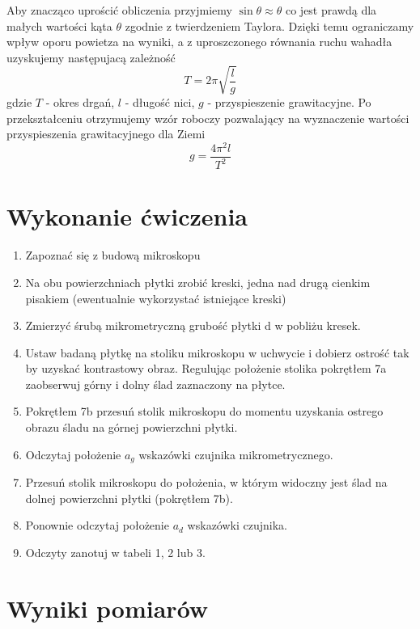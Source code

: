 \documentclass[a4paper,10pt,twoside]{article}
\begin{document}
	Aby znacząco uprościć obliczenia przyjmiemy $\sin\theta\approx\theta$ co jest prawdą dla małych wartości kąta $\theta$ zgodnie z
	twierdzeniem Taylora. Dzięki temu ograniczamy wpływ oporu powietza na wyniki, a z uproszczonego równania ruchu wahadła
	uzyskujemy następujacą zależność
	\begin{equation}
	T=2\pi\sqrt{\frac{l}{g}}
	\end{equation}
	gdzie $T$ - okres drgań, $l$ - długość nici, $g$ - przyspieszenie grawitacyjne. Po przekształceniu otrzymujemy wzór roboczy pozwalający
	na wyznaczenie wartości przyspieszenia grawitacyjnego dla Ziemi
	\begin{equation}
	\label{eq:working_g}
	g=\frac{4\pi^2l}{T^2}
	\end{equation}
	\newpage
	\section{Wykonanie ćwiczenia}
	
	\begin{enumerate}
		\item Zapoznać się z budową mikroskopu
		\item Na obu powierzchniach płytki zrobić kreski, jedna nad drugą cienkim pisakiem (ewentualnie wykorzystać istniejące kreski)
		\item Zmierzyć śrubą
		mikrometryczną
		grubość płytki d w pobliżu kresek. 
		\item Ustaw  badaną
		płytkę
		na  stoliku  mikroskopu  w  uchwycie  i  dobierz  ostrość
		tak  by  uzyskać
		kontrastowy obraz. Regulując położenie stolika pokrętłem 7a zaobserwuj górny i dolny 
		ślad zaznaczony na płytce. 
		\item Pokrętłem 7b przesuń stolik mikroskopu do momentu uzyskania ostrego obrazu śladu na górnej powierzchni płytki.
		\item Odczytaj położenie $a_g$ wskazówki czujnika mikrometrycznego. 
		\item Przesuń stolik mikroskopu do położenia, w którym widoczny jest ślad na dolnej powierzchni płytki (pokrętłem 7b). 
		\item Ponownie odczytaj położenie $a_d$ wskazówki czujnika.
		\item Odczyty zanotuj w tabeli 1, 2 lub 3.
	\end{enumerate}
	
	
	\section{Wyniki pomiarów}
\end{document}
